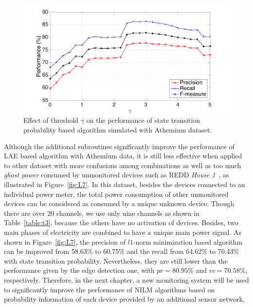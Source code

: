 \begin{figure}
\centering
\includegraphics[width=.8\textwidth]{./chapters/chapter3/images/PROBAvsTHR.pdf} 
\caption{Effect of threshold $\gamma$ on the performance of state transition probability based algorithm simulated with Athemium dataset.}
\label{fig:L6} 
\end{figure}

Although the additional subroutines significantly improve the performance of LAE based algorithm with Athemium data, it is still less effective when applied to other dataset with more confusions among combinations as well as too much \emph{ghost power} consumed by unmonitored devices such as REDD \emph{House 1}~\cite{Kolter11redd}, as illustrated in Figure~\ref{fig:L7}. In this dataset, besides the devices connected to an individual power meter, the total power consumption of other unmonitored devices can be considered as consumed by a unique unknown device. Though there are over 20 channels, we use only nine channels as shown in Table~\ref{table:t3}, because the others have no activation of devices. Besides, two main phases of electricity are combined to have a unique main power signal.
As shown in Figure~\ref{fig:L7}, the precision of $l1$-norm minimization based algorithm can be improved from 58.63$\%$ to 60.75$\%$ and the recall from 64.62$\%$ to 70.43$\%$ with state transition probability. Nevertheless, they are still lower than the performance given by the edge detection one, with $pr=80.95\%$ and $rc = 70.58\%$, respectively. Therefore, in the next chapter, a new monitoring system will be used to significantly improve the performance of NILM algorithms based on probability information of each device provided by an additional sensor network.

